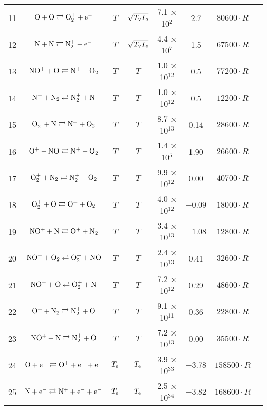 \documentclass{warpdoc}
\begin{document}
\begin{table}[t]
\begin{center}
\begin{threeparttable}
\begin{tabular}{cccccccc}
11 & $\rm O + O \rightleftarrows O_2^+ + e^- $ & $T$ & $\sqrt{T_{\rm v}T_{\rm e}}$ & 7.1 $\times$ 10$^{2}$  & 2.7 & $80600 \cdot R$ & \cite{jtht:1993:park}\\
12 & $\rm N + N \rightleftarrows N_2^+ + e^- $ & $T$ & $\sqrt{T_{\rm v}T_{\rm e}}$ & 4.4 $\times$ 10$^{7}$  & 1.5 & $67500 \cdot R$ & \cite{jtht:1993:park}\\
13 & $\rm NO^+ + O \rightleftarrows N^+ + O_2 $ & $T$ & $T$ & 1.0 $\times$ 10$^{12}$  & 0.5 & $77200 \cdot R$ & \cite{book:1990:park}\\
14 & $\rm N^+ + N_2 \rightleftarrows N_2^+ + N $ & $T$ & $T$ & 1.0 $\times$ 10$^{12}$  & 0.5 & $12200 \cdot R$ & \cite{book:1990:park}\\
15 & $\rm O_2^+ + N \rightleftarrows N^+ + O_2 $ & $T$ & $T$ & 8.7 $\times$ 10$^{13}$  & 0.14 & $28600 \cdot R$ & \cite{book:1990:park}\\
16 & $\rm O^+ + NO \rightleftarrows N^+ + O_2 $ & $T$ & $T$ & 1.4 $\times$ 10$^{5}$  & 1.90 & $26600 \cdot R$ & \cite{book:1990:park}\\
17 & $\rm O_2^+ + N_2 \rightleftarrows N_2^+ + O_2 $ & $T$ & $T$ & 9.9 $\times$ 10$^{12}$  & 0.00 & $40700 \cdot R$ & \cite{book:1990:park}\\
18 & $\rm O_2^+ + O \rightleftarrows O^+ + O_2 $ & $T$ & $T$ & 4.0 $\times$ 10$^{12}$  & $-0.09$ & $18000 \cdot R$ & \cite{book:1990:park}\\
19 & $\rm NO^+ + N \rightleftarrows O^+ + N_2 $ & $T$ & $T$ & 3.4 $\times$ 10$^{13}$  & $-1.08$ & $12800 \cdot R$ & \cite{book:1990:park}\\
20 & $\rm NO^+ + O_2 \rightleftarrows O_2^+ + NO $ & $T$ & $T$ & 2.4 $\times$ 10$^{13}$  & 0.41 & $32600 \cdot R$ & \cite{book:1990:park}\\
21 & $\rm NO^+ + O \rightleftarrows O_2^+ + N $ & $T$ & $T$ & 7.2 $\times$ 10$^{12}$  & 0.29 & $48600 \cdot R$ & \cite{book:1990:park}\\
22 & $\rm O^+ + N_2 \rightleftarrows N_2^+ + O $ & $T$ & $T$ & 9.1 $\times$ 10$^{11}$  & 0.36 & $22800 \cdot R$ & \cite{book:1990:park}\\
23 & $\rm NO^+ + N \rightleftarrows N_2^+ + O $ & $T$ & $T$ & 7.2 $\times$ 10$^{13}$  & 0.00 & $35500 \cdot R$ & \cite{book:1990:park}\\
24 & $\rm O + e^- \rightleftarrows O^+ + e^- + e^- $ & $T_{\rm e}$ & $T_{\rm e}$ & 3.9 $\times$ 10$^{33}$  & $-3.78$ & $158500 \cdot R$ & \cite{book:1990:park}\\
25 & $\rm N + e^- \rightleftarrows N^+ + e^- + e^- $ & $T_{\rm e}$ & $T_{\rm e}$ & 2.5 $\times$ 10$^{34}$  & $-3.82$ & $168600 \cdot R$ & \cite{book:1990:park}\\

\end{tabular}
\end{threeparttable}
\end{center}
\end{table}
\end{document}
